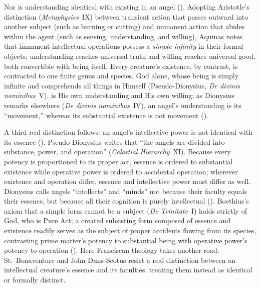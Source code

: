 Nor is understanding identical with existing in an angel (). Adopting Aristotle's distinction (\emph{Metaphysics}~IX) between transient action that passes outward into another subject (such as burning or cutting) and immanent action that abides within the agent (such as sensing, understanding, and willing), Aquinas notes that immanent intellectual operations possess a \emph{simple infinity} in their formal objects: understanding reaches universal truth and willing reaches universal good, both convertible with being itself. Every creature's existence, by contrast, is contracted to one finite genus and species. God alone, whose being is simply infinite and comprehends all things in Himself (Pseudo-Dionysius, \emph{De divinis nominibus}~V), is His own understanding and His own willing; as Dionysius remarks elsewhere (\emph{De divinis nominibus}~IV), an angel's understanding is its ``movement,'' whereas its substantial existence is not movement ().

A third real distinction follows: an angel's intellective power is not identical with its essence (). Pseudo-Dionysius writes that ``the angels are divided into substance, power, and operation'' (\emph{Celestial Hierarchy}~XI). Because every potency is proportioned to its proper act, essence is ordered to substantial existence while operative power is ordered to accidental operation; wherever existence and operation differ, essence and intellective power must differ as well. Dionysius calls angels ``intellects'' and ``minds'' not because their faculty equals their essence, but because all their cognition is purely intellectual (). Boethius's axiom that a simple form cannot be a subject (\emph{De Trinitate}~I) holds strictly of God, who is Pure Act; a created subsisting form composed of essence and existence readily serves as the subject of proper accidents flowing from its species, contrasting prime matter's potency to substantial being with operative power's potency to operation (). Here Franciscan theology takes another road: St.~Bonaventure and John Duns Scotus resist a real distinction between an intellectual creature's essence and its faculties, treating them instead as identical or formally distinct.

